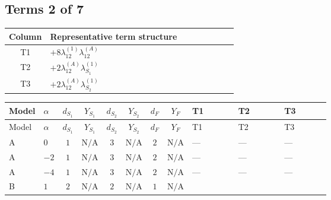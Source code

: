 \documentclass[8pt]{article}
\begin{document}
\begin{landscape}
\subsection*{Terms 2 of 7}
\begin{center}
\begin{tabular}{@{}c >{\raggedright\arraybackslash}p{0.82\linewidth}@{}}
\toprule
Column & Representative term structure \\
\midrule
T1 & \(\displaystyle +8 {\lambda_{12}^{(1)}} {\lambda_{12}^{(A)}}\) \\
\midrule
T2 & \(\displaystyle +2 {\lambda_{12}^{(A)}} {\lambda_{S_1}^{(1)}}\) \\
\midrule
T3 & \(\displaystyle +2 {\lambda_{12}^{(A)}} {\lambda_{S_2}^{(1)}}\) \\
\midrule
\bottomrule
\end{tabular}
\end{center}
\smallskip
\tiny
\begin{longtable}{@{}llcccccc >{\raggedright\arraybackslash}p{0.21\linewidth} >{\raggedright\arraybackslash}p{0.21\linewidth} >{\raggedright\arraybackslash}p{0.21\linewidth}@{}}
\toprule
Model & $\alpha$ & $d_{S_1}$ & $Y_{S_1}$ & $d_{S_2}$ & $Y_{S_2}$ & $d_F$ & $Y_F$ & T1 & T2 & T3 \\
\midrule
\endfirsthead
\toprule
Model & $\alpha$ & $d_{S_1}$ & $Y_{S_1}$ & $d_{S_2}$ & $Y_{S_2}$ & $d_F$ & $Y_F$ & T1 & T2 & T3 \\
\midrule
\endhead
A & $0$ & $1$ & $\text{N/A}$ & $3$ & $\text{N/A}$ & $2$ & $\text{N/A}$ & --- & --- & --- \\
\midrule
A & $-2$ & $1$ & $\text{N/A}$ & $3$ & $\text{N/A}$ & $2$ & $\text{N/A}$ & --- & --- & --- \\
\midrule
A & $-4$ & $1$ & $\text{N/A}$ & $3$ & $\text{N/A}$ & $2$ & $\text{N/A}$ & --- & --- & --- \\
\midrule
B & $1$ & $2$ & $\text{N/A}$ & $2$ & $\text{N/A}$ & $1$ & $\text{N/A}$ & \scriptsize\adjustbox{max width=\linewidth}{$\begin{gathered} +8 {\lambda_{12}^{(1)}} {\lambda_{12}^{(A)}}\end{gathered}$} & \scriptsize\adjustbox{max width=\linewidth}{$\begin{gathered} +2 {\lambda_{12}^{(A)}} {\lambda_{S_1}^{(1)}}\end{gathered}$} & \scriptsize\adjustbox{max width=\linewidth}{$\begin{gathered} +2 {\lambda_{12}^{(A)}} {\lambda_{S_2}^{(1)}}\end{gathered}$} \\

\end{longtable}
\end{landscape}
\end{document}
